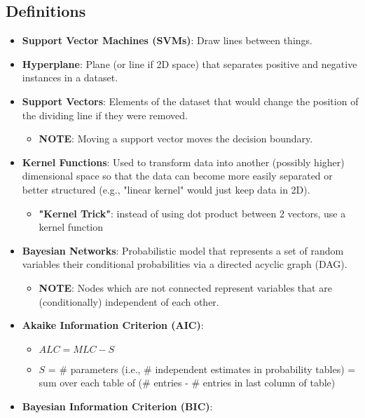 \documentclass[fontsize=4pt]{scrartcl}
\begin{document}
\begin{multicols}{3}
\section{Definitions}

\begin{itemize}
	\item {\bf Support Vector Machines (SVMs)}: Draw lines between things.
	\item {\bf Hyperplane}: Plane (or line if 2D space) that separates positive and negative instances in a dataset.
	\item {\bf Support Vectors}: Elements of the dataset that would change the position of the dividing line if they were removed.
		\begin{itemize}
			\item {\bf NOTE}: Moving a support vector moves the decision boundary.
		\end{itemize} 
	\item {\bf Kernel Functions}: Used to transform data into another (possibly higher) dimensional space so that the data can become more easily separated or better structured (e.g., "linear kernel" would just keep data in 2D).
		\begin{itemize}
			\item {\bf "Kernel Trick"}: instead of using dot product between 2 vectors, use a kernel function
		\end{itemize}
	\item {\bf Bayesian Networks}: Probabilistic model that represents a set of random variables their conditional probabilities via a directed acyclic graph (DAG).
		\begin{itemize}
			\item {\bf NOTE}: Nodes which are not connected represent variables that are (conditionally) independent of each other.
		\end{itemize}
	\item {\bf Akaike Information Criterion (AIC)}:
		\begin{itemize}
			\item $ALC = MLC - S$
			\item $S$ = \# parameters (i.e., \# independent estimates in probability tables) = sum over each table of (\# entries - \# entries in last column of table)
		\end{itemize}
	\item {\bf Bayesian Information Criterion (BIC)}:
		\begin{itemize}

\end{itemize}
\end{itemize}
\end{multicols}
\end{document}
